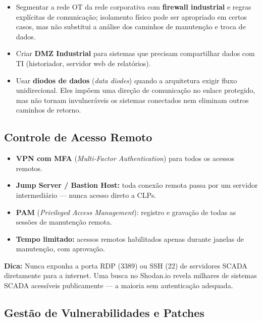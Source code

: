 \begin{itemize}
\tightlist
\item
  Segmentar a rede OT da rede corporativa com \textbf{firewall industrial} e regras explícitas de comunicação; isolamento físico pode ser apropriado em certos casos, mas não substitui a análise dos caminhos de manutenção e troca de dados.
\item
  Criar \textbf{DMZ Industrial} para sistemas que precisam compartilhar dados com TI (historiador, servidor web de relatórios).
\item
  Usar \textbf{diodos de dados} (\emph{data diodes}) quando a arquitetura exigir fluxo unidirecional. Eles impõem uma direção de comunicação no enlace protegido, mas não tornam invulneráveis os sistemas conectados nem eliminam outros caminhos de retorno.
\end{itemize}

\subsection{Controle de Acesso Remoto}\label{controle-de-acesso-remoto}

\begin{itemize}
\tightlist
\item
  \textbf{VPN com MFA} (\emph{Multi-Factor Authentication}) para todos os acessos remotos.
\item
  \textbf{Jump Server / Bastion Host:} toda conexão remota passa por um servidor intermediário --- nunca acesso direto a CLPs.
\item
  \textbf{PAM} (\emph{Privileged Access Management}): registro e gravação de todas as sessões de manutenção remota.
\item
  \textbf{Tempo limitado:} acessos remotos habilitados apenas durante janelas de manutenção, com aprovação.
\end{itemize}

\begin{caixadica}

\textbf{Dica:} Nunca exponha a porta RDP (3389) ou SSH (22) de servidores SCADA diretamente para a internet. Uma busca no Shodan.io revela milhares de sistemas SCADA acessíveis publicamente --- a maioria sem autenticação adequada.

\end{caixadica}

\subsection{Gestão de Vulnerabilidades e Patches}\label{gestuxe3o-de-vulnerabilidades-e-patches}

